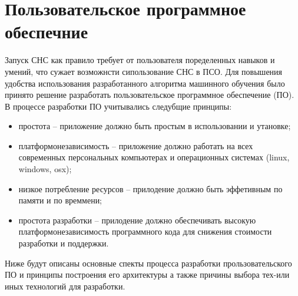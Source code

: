 \section{Пользовательское программное обеспечние}

Запуск СНС как правило требует от пользователя поределенных навыков и умений, что сужает возможнсти сипользование СНС в ПСО. Для повышения удобства использования разработанного алгоритма машинного обучения было принято решение разработать пользовательское программное обеспечение (ПО). В процессе разработки ПО учитывались следубщие принципы:
\begin{itemize}
    \item простота -- приложение должно быть простым в использовании и утановке;
    \item платформонезависимость -- приложение должно работать на всех современных персональных компьютерах и операционных системах (linux, windows, osx);
    \item низкое потребление ресурсов -- прилодение должно быть эффетивным по памяти и по времмени;
    \item простота разработки -- прилодение должно обеспечивать высокую платформонезависимость программного кода для снижения стоимости разработки и поддержки.
\end{itemize}

Ниже будут описаны основные спекты процесса разработки прользовательского ПО и принципы построения его архитектуры а также причины выбора тех-или иных технологий для разработки.





\clearpage